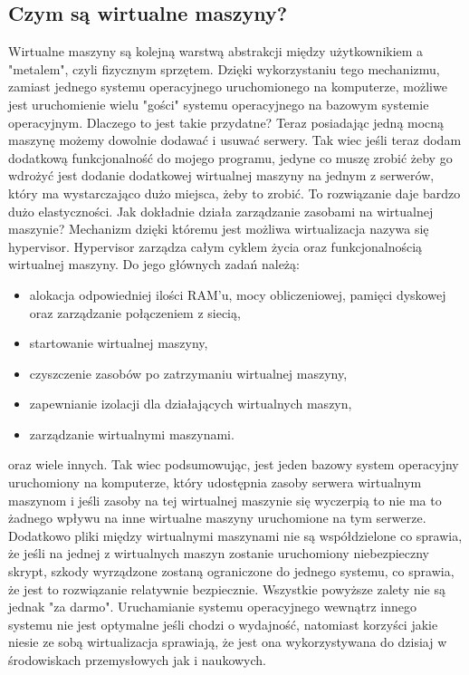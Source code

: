 \subsection{Czym są wirtualne maszyny?}
Wirtualne maszyny są kolejną warstwą abstrakcji między użytkownikiem a "metalem", czyli fizycznym sprzętem. Dzięki wykorzystaniu tego mechanizmu, zamiast jednego systemu operacyjnego uruchomionego na komputerze, możliwe jest uruchomienie wielu "gości" systemu operacyjnego na bazowym systemie operacyjnym. Dlaczego to jest takie przydatne? Teraz posiadając jedną mocną maszynę możemy dowolnie dodawać i usuwać serwery. Tak wiec jeśli  teraz dodam dodatkową funkcjonalność do mojego programu, jedyne co muszę zrobić żeby go wdrożyć jest dodanie dodatkowej wirtualnej maszyny na jednym z serwerów, który ma wystarczająco dużo miejsca, żeby to zrobić. To rozwiązanie daje bardzo dużo elastyczności. 
Jak dokładnie działa zarządzanie zasobami na wirtualnej maszynie?
Mechanizm dzięki któremu jest możliwa wirtualizacja nazywa się hypervisor. Hypervisor zarządza całym cyklem życia oraz funkcjonalnością wirtualnej maszyny. 
Do jego głównych zadań należą:
\begin{itemize}
    \item alokacja odpowiedniej ilości RAM'u, mocy obliczeniowej, pamięci dyskowej oraz zarządzanie połączeniem z siecią,
    \item startowanie wirtualnej maszyny,
    \item czyszczenie zasobów po zatrzymaniu wirtualnej maszyny,
    \item zapewnianie izolacji dla działających wirtualnych maszyn,
    \item zarządzanie wirtualnymi maszynami.
\end{itemize}
oraz wiele innych. 
Tak wiec podsumowując, jest jeden bazowy system operacyjny uruchomiony na komputerze, który udostępnia zasoby serwera wirtualnym maszynom i jeśli zasoby na tej wirtualnej maszynie się wyczerpią to nie ma to żadnego wpływu na inne wirtualne maszyny uruchomione na tym serwerze. Dodatkowo pliki między wirtualnymi maszynami nie są współdzielone co sprawia, że jeśli na jednej z wirtualnych maszyn zostanie uruchomiony niebezpieczny skrypt, szkody wyrządzone zostaną ograniczone do jednego systemu, co sprawia, że jest to rozwiązanie relatywnie bezpiecznie.
Wszystkie powyższe zalety nie są jednak "za darmo". Uruchamianie systemu operacyjnego wewnątrz innego systemu nie jest optymalne jeśli chodzi o wydajność, natomiast korzyści jakie niesie ze sobą wirtualizacja sprawiają, że jest ona wykorzystywana do dzisiaj w środowiskach przemysłowych jak i naukowych. 
